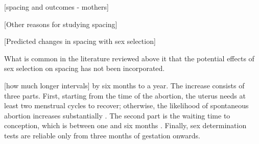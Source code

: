 [spacing and outcomes - mothers]


[Other reasons for studying spacing]


[Predicted changes in spacing with sex selection]

What is common in the literature reviewed above it that the potential effects of 
sex selection on spacing has not been incorporated.

[how much longer intervals]
 by six months to a year.
The increase consists of three parts.
First, starting from the time of the abortion, the uterus needs at 
least two menstrual cycles to recover;  otherwise, the likelihood 
of spontaneous abortion increases substantially \citep{zhou00b}.
The second part is the waiting time to conception, which is between 
one and six months \citep{Wang2003}.
Finally, sex determination tests are reliable only from three months 
of gestation onwards.

 
